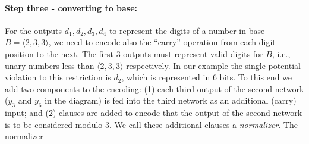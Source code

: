\documentclass[envcountsame]{llncs}
\newcommand\tuple[1]{\langle #1 \rangle}
\begin{document}
\paragraph{\textbf{Step three - converting to base:}}
For the  outputs $d_1,d_2,d_3,d_4$ to represent the
digits of a number in base $B=\tuple{2,3,3}$, we need to encode
also the ``carry'' operation from each digit position to the next.
The first 3 outputs must represent
valid digits for $B$, i.e., unary numbers less than $\tuple{2,3,3}$
respectively. In our example the single potential violation to this
restriction is $d_2$, which is represented in 6 bits.  To this end we
add two components to the encoding: (1) each third output of the
second network ($y_3$ and $y_6$ in the diagram) is fed into the third
network as an additional (carry) input; and (2) clauses are added to
encode that the output of the second network is to be considered
modulo 3. We call these additional clauses a \emph{normalizer}. 
The normalizer 
\end{document}
